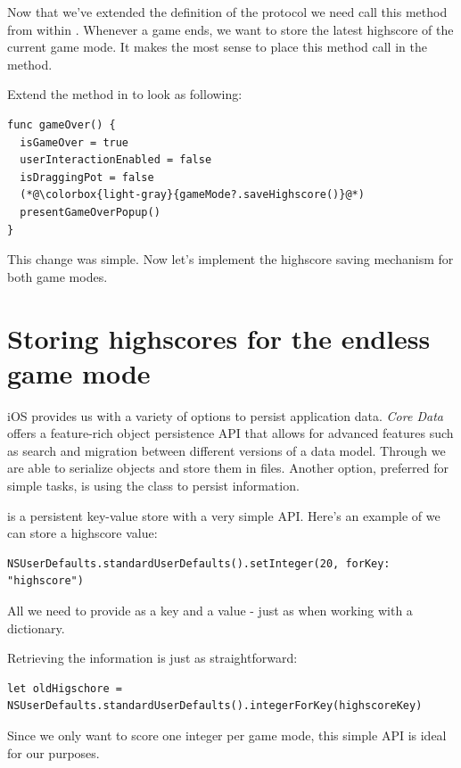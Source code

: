 Now that we've extended the definition of the protocol we need call this method
from within . Whenever a game ends, we want to store the
latest highscore of the current game mode. It makes the most sense to place this
method call in the  method.

\begin{leftbar}
Extend the  method in  to look
as following:
\begin{lstlisting}
func gameOver() {
  isGameOver = true
  userInteractionEnabled = false
  isDraggingPot = false
  (*@\colorbox{light-gray}{gameMode?.saveHighscore()}@*)
  presentGameOverPopup()
}
\end{lstlisting}
\end{leftbar}

This change was simple. Now let's implement the highscore saving mechanism for
both game modes.

\section{Storing highscores for the endless game mode}
iOS provides us with a variety of options to persist application data.
\textit{Core Data} offers a feature-rich object persistence API that allows for
advanced features such as search and migration between different versions of a data model. Through
 we are able to serialize objects and store them
in files. Another option, preferred for simple tasks, is using the
 class to persist information.

 is a persistent key-value store with a very simple
API. Here's an example of we can store a highscore value:
\begin{lstlisting}
NSUserDefaults.standardUserDefaults().setInteger(20, forKey: "highscore")
\end{lstlisting}
All we need to provide as a key and a value - just as when working with a
dictionary. 

Retrieving the information is just as straightforward:
\begin{lstlisting}
let oldHigschore =
NSUserDefaults.standardUserDefaults().integerForKey(highscoreKey)
\end{lstlisting}

Since we only want to score one integer per game mode, this simple API is ideal
for our purposes.

